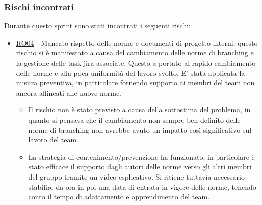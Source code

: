 \documentclass[a4paper,12pt]{article}
\begin{document}
\subsubsection{Rischi incontrati}
Durante questo sprint sono stati incontrati i seguenti rischi:
\begin{itemize}
    \item \hyperref[RO04]{RO04} - Mancato rispetto delle norme e documenti di progetto interni: questo rischio si è manifestato a causa del cambiamento delle norme di branching e la gestione delle task jira associate. Questo a portato al rapido cambiamento delle norme e alla poca uniformità del lavoro svolto. E' stata applicata la misura preventiva, in particolare fornendo supporto ai membri del team non ancora allineati alle nuove norme.
    \begin{itemize}
        \item Il rischio non è stato previsto a causa della sottostima del problema, in quanto si pensava che il cambiamento non sempre ben definito delle norme di branching non avrebbe avuto un impatto così significativo sul lavoro del team.
        \item La strategia di contenimento/prevenzione ha funzionato, in particolare è stato efficace il supporto dagli autori delle norme verso gli altri membri del gruppo tramite un video esplicativo. Si ritiene tuttavia necessario stabilire da ora in poi una data di entrata in vigore delle norme, tenendo conto il tempo di adattamento e apprendimento del team.
    \end{itemize}
\end{itemize}
\end{document}
